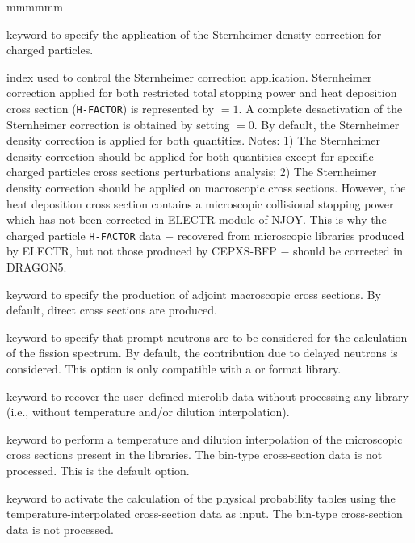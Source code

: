 \begin{ListeDeDescription}{mmmmmm}
\item[\moc{STERN}] keyword to specify the application of the Sternheimer density correction for charged particles.

\item[\dusa{nstern}] index used to control the Sternheimer correction application. Sternheimer correction applied for both restricted total stopping power
and heat deposition cross section ({\tt H-FACTOR}) is represented by  $=1$. A complete desactivation of the Sternheimer correction is obtained
by setting  $=0$. By default, the Sternheimer density correction is applied for both quantities. Notes: 1) The Sternheimer density correction should be
applied for both quantities except for specific charged particles cross sections perturbations analysis; 2) The Sternheimer density correction should be
applied on macroscopic cross sections. However, the heat deposition cross section contains a microscopic collisional stopping power which has not been
corrected in ELECTR module of NJOY. This is why the charged particle {\tt H-FACTOR} data $-$ recovered from microscopic libraries produced by ELECTR, but not
those produced by CEPXS-BFP $-$ should be corrected in DRAGON5.

\item[\moc{ADJ}] keyword to specify the production of adjoint macroscopic
cross sections. By default, direct cross sections are produced.

\item[\moc{PROM}] keyword to specify that prompt neutrons are to be considered
for the calculation of the fission spectrum. By default, the contribution due to
delayed neutrons is considered. This option is only compatible with a
 or  format library.

\item[\moc{SKIP}] keyword to recover the user--defined microlib data without processing
any library (i.e., without temperature and/or dilution interpolation).

\item[\moc{INTR}] keyword to perform a temperature and dilution interpolation
of the microscopic cross sections present in the libraries. The bin-type
cross-section data is not processed. This is the default option.

\item[\moc{SUBG}] keyword to activate the calculation of the physical probability
tables using the tempera\-tu\-re-interpolated cross-section data as
input.\cite{subg,nse2004} The bin-type cross-section data is not processed.


\end{ListeDeDescription}
